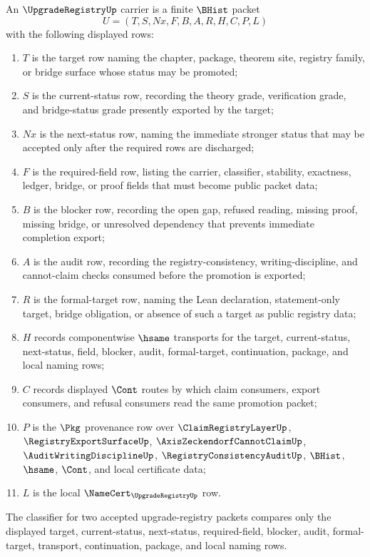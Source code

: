 \begin{definition}
\label{def:upgrade-registry-carrier}
An $\UpgradeRegistryUp$ carrier is a finite $\BHist$ packet
$$
U=(T,S,Nx,F,B,A,R,H,C,P,L)
$$
with the following displayed rows:
\begin{enumerate}
\item $T$ is the target row naming the chapter, package, theorem site, registry family, or bridge surface whose status may be promoted;
\item $S$ is the current-status row, recording the theory grade, verification grade, and bridge-status grade presently exported by the target;
\item $Nx$ is the next-status row, naming the immediate stronger status that may be accepted only after the required rows are discharged;
\item $F$ is the required-field row, listing the carrier, classifier, stability, exactness, ledger, bridge, or proof fields that must become public packet data;
\item $B$ is the blocker row, recording the open gap, refused reading, missing proof, missing bridge, or unresolved dependency that prevents immediate completion export;
\item $A$ is the audit row, recording the registry-consistency, writing-discipline, and cannot-claim checks consumed before the promotion is exported;
\item $R$ is the formal-target row, naming the Lean declaration, statement-only target, bridge obligation, or absence of such a target as public registry data;
\item $H$ records componentwise $\hsame$ transports for the target, current-status, next-status, field, blocker, audit, formal-target, continuation, package, and local naming rows;
\item $C$ records displayed $\Cont$ routes by which claim consumers, export consumers, and refusal consumers read the same promotion packet;
\item $P$ is the $\Pkg$ provenance row over $\ClaimRegistryLayerUp$, $\RegistryExportSurfaceUp$, $\AxisZeckendorfCannotClaimUp$, $\AuditWritingDisciplineUp$, $\RegistryConsistencyAuditUp$, $\BHist$, $\hsame$, $\Cont$, and local certificate data;
\item $L$ is the local $\NameCert_{\UpgradeRegistryUp}$ row.
\end{enumerate}
The classifier for two accepted upgrade-registry packets compares only the displayed target, current-status, next-status, required-field, blocker, audit, formal-target, transport, continuation, package, and local naming rows.
\end{definition}

